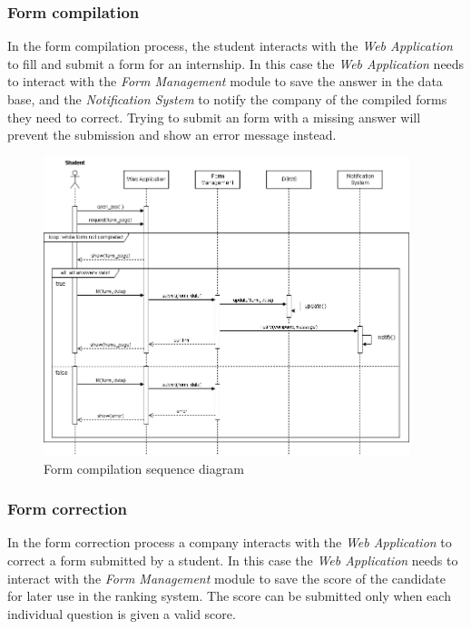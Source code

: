 \documentclass[11pt,twoside]{article}
\begin{document}
\newpage

		\subsubsection{Form compilation}
In the form compilation process, the student interacts with the \textit{Web Application} to fill and submit a form for an internship.	In this case the \textit{Web Application} needs to interact with the \textit{Form Management} module to save the answer in the data base, and the \textit{Notification System} to notify the company of the compiled forms they need to correct. Trying to submit an form with a missing answer will prevent the submission and show an error message instead.
		
\begin{figure}[H]
\centering
\includegraphics[width=0.95\textwidth]{Images/Seq6}
\caption{Form compilation sequence diagram}\label{Seq6}
\end{figure}

\newpage

		\subsubsection{Form correction}
In the form correction process a company interacts with the \textit{Web Application} to correct a form submitted by a student. In this case the \textit{Web Application} needs to interact with the \textit{Form Management} module to save the score of the candidate for later use in the ranking system. The score can be submitted only when each individual question is given a valid score.
\end{document}
